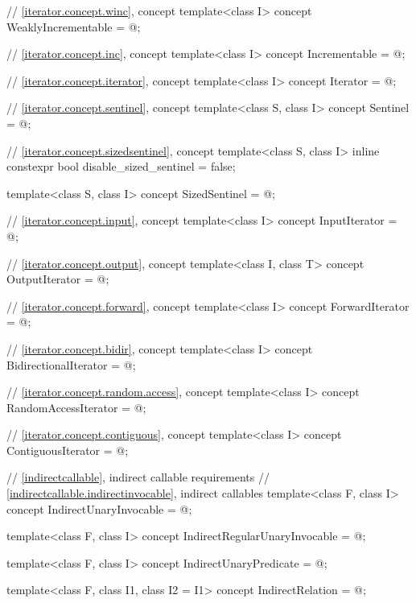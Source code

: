 \begin{codeblock}
{  // \ref{iterator.concept.winc}, concept 
  template<class I>
    concept WeaklyIncrementable = @\seebelow@;

  // \ref{iterator.concept.inc}, concept 
  template<class I>
    concept Incrementable = @\seebelow@;

  // \ref{iterator.concept.iterator}, concept 
  template<class I>
    concept Iterator = @\seebelow@;

  // \ref{iterator.concept.sentinel}, concept 
  template<class S, class I>
    concept Sentinel = @\seebelow@;

  // \ref{iterator.concept.sizedsentinel}, concept 
  template<class S, class I>
    inline constexpr bool disable_sized_sentinel = false;

  template<class S, class I>
    concept SizedSentinel = @\seebelow@;

  // \ref{iterator.concept.input}, concept 
  template<class I>
    concept InputIterator = @\seebelow@;

  // \ref{iterator.concept.output}, concept 
  template<class I, class T>
    concept OutputIterator = @\seebelow@;

  // \ref{iterator.concept.forward}, concept 
  template<class I>
    concept ForwardIterator = @\seebelow@;

  // \ref{iterator.concept.bidir}, concept 
  template<class I>
    concept BidirectionalIterator = @\seebelow@;

  // \ref{iterator.concept.random.access}, concept 
  template<class I>
    concept RandomAccessIterator = @\seebelow@;

  // \ref{iterator.concept.contiguous}, concept 
  template<class I>
    concept ContiguousIterator = @\seebelow@;

  // \ref{indirectcallable}, indirect callable requirements
  // \ref{indirectcallable.indirectinvocable}, indirect callables
  template<class F, class I>
    concept IndirectUnaryInvocable = @\seebelow@;

  template<class F, class I>
    concept IndirectRegularUnaryInvocable = @\seebelow@;

  template<class F, class I>
    concept IndirectUnaryPredicate = @\seebelow@;

  template<class F, class I1, class I2 = I1>
    concept IndirectRelation = @\seebelow@;

}
\end{codeblock}
